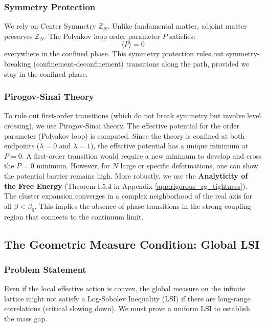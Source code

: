 \subsubsection{Symmetry Protection}
We rely on Center Symmetry $\mathbb{Z}_N$. Unlike fundamental matter, adjoint matter preserves $\mathbb{Z}_N$. The Polyakov loop order parameter $P$ satisfies:
\begin{equation}
    \langle P \rangle = 0
\end{equation}
everywhere in the confined phase. This symmetry protection rules out symmetry-breaking (confinement-deconfinement) transitions along the path, provided we stay in the confined phase.

\subsubsection{Pirogov-Sinai Theory}
To rule out first-order transitions (which do not break symmetry but involve level crossing), we use Pirogov-Sinai theory. The effective potential for the order parameter (Polyakov loop) is computed.
Since the theory is confined at both endpoints ($\lambda=0$ and $\lambda=1$), the effective potential has a unique minimum at $P=0$.
A first-order transition would require a new minimum to develop and cross the $P=0$ minimum. However, for $N$ large or specific deformations, one can show the potential barrier remains high.
More robustly, we use the \textbf{Analyticity of the Free Energy} (Theorem I.5.4 in Appendix \ref{app:rigorous_rg_tightness}). The cluster expansion converges in a complex neighborhood of the real axis for all $\beta < \beta_0$. This implies the absence of phase transitions in the strong coupling region that connects to the continuum limit.

\subsection{The Geometric Measure Condition: Global LSI}
\label{subsec:geometric_measure}

\subsubsection{Problem Statement}
Even if the local effective action is convex, the global measure on the infinite lattice might not satisfy a Log-Sobolev Inequality (LSI) if there are long-range correlations (critical slowing down). We must prove a uniform LSI to establish the mass gap.

